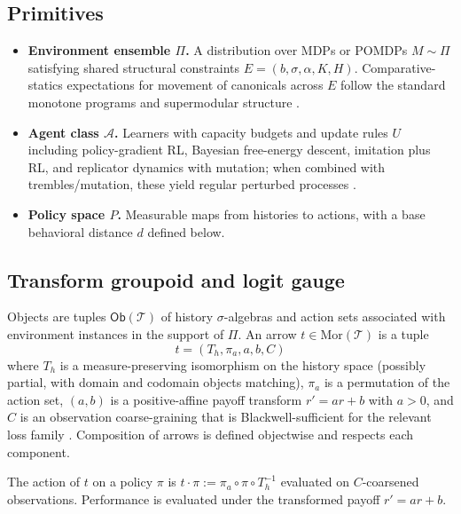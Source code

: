 \documentclass[11pt]{article}
\newcommand{\1}{\mathbbm{1}}
\begin{document}
\subsection{Primitives}
\begin{itemize}[leftmargin=2em]
    \item \textbf{Environment ensemble $\Pi$.} A distribution over MDPs or POMDPs $M \sim \Pi$ satisfying shared structural constraints $E = (b,\sigma,\alpha,K,H)$. Comparative-statics expectations for movement of canonicals across $E$ follow the standard monotone programs and supermodular structure \parencite{Topkis1998,MilgromShannon1994}.
    \item \textbf{Agent class $\mathcal{A}$.} Learners with capacity budgets and update rules $U$ including policy-gradient RL, Bayesian free-energy descent, imitation plus RL, and replicator dynamics with mutation; when combined with trembles/mutation, these yield regular perturbed processes \parencite{Young1993,Kandori1993}.
    \item \textbf{Policy space $P$.} Measurable maps from histories to actions, with a base behavioral distance $d$ defined below.
\end{itemize}

\subsection{Transform groupoid and logit gauge}
\begin{definition}
Objects are tuples $\mathsf{Ob}(\mathcal{T})$ of history $\sigma$-algebras and action sets associated with environment instances in the support of $\Pi$. An arrow $t \in \mathrm{Mor}(\mathcal{T})$ is a tuple
\[
t = (T_h, \pi_a, a, b, C)
\]
where $T_h$ is a measure-preserving isomorphism on the history space (possibly partial, with domain and codomain objects matching), $\pi_a$ is a permutation of the action set, $(a,b)$ is a positive-affine payoff transform $r' = a r + b$ with $a>0$, and $C$ is an observation coarse-graining that is Blackwell-sufficient for the relevant loss family \parencite{Blackwell1953}. Composition of arrows is defined objectwise and respects each component.
\end{definition}

\begin{definition}
The action of $t$ on a policy $\pi$ is $t \cdot \pi := \pi_a \circ \pi \circ T_h^{-1}$ evaluated on $C$-coarsened observations. Performance is evaluated under the transformed payoff $r' = a r + b$.
\end{definition}
\end{document}
